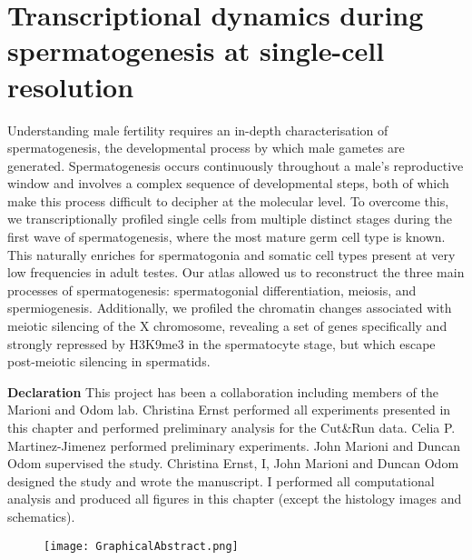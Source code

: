 
\chapter{Transcriptional dynamics during spermatogenesis at single-cell resolution}  

\graphicspath{{Chapter3/Figures/}}

\begin{Abstract}
Understanding male fertility requires an in-depth characterisation of spermatogenesis, the developmental process by which male gametes are generated. Spermatogenesis occurs continuously throughout a male’s reproductive window and involves a complex sequence of developmental steps, both of which make this process difficult to decipher at the molecular level. To overcome this, we transcriptionally profiled single cells from multiple distinct stages during the first wave of spermatogenesis, where the most mature germ cell type is known. This naturally enriches for spermatogonia and somatic cell types present at very low frequencies in adult testes. Our atlas allowed us to reconstruct the three main processes of spermatogenesis: spermatogonial differentiation, meiosis, and spermiogenesis. Additionally, we profiled the chromatin changes associated with meiotic silencing of the X chromosome, revealing a set of genes specifically and strongly repressed by H3K9me3 in the spermatocyte stage, but which escape post-meiotic silencing in spermatids.
\end{Abstract}

\newpage

\begin{Comment}
\textbf{Declaration} This project has been a collaboration including members of the Marioni and Odom lab. Christina Ernst performed all experiments presented in this chapter and performed preliminary analysis for the Cut\&Run data. Celia P. Martinez-Jimenez performed preliminary experiments. John Marioni and Duncan Odom supervised the study. Christina Ernst, I, John Marioni and Duncan Odom designed the study and wrote the manuscript. I performed all computational analysis and produced all figures in this chapter (except the histology images and schematics).
\end{Comment}

\begin{figure}[hb]
\centering    
\texttt{[image: GraphicalAbstract.png]}
\caption*{}
\end{figure}


\newpage


\newpage


